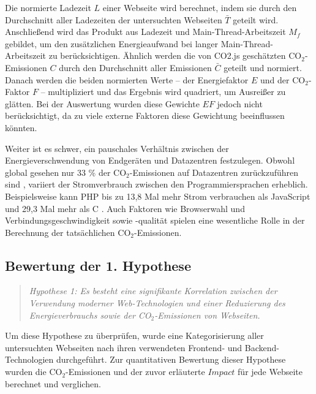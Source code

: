 \documentclass[Bachelor,BIF,german,IEEE]{BASE/twbook}
\begin{document}
\noindent Die normierte Ladezeit $L$ einer Webseite wird berechnet, indem sie durch den Durchschnitt aller Ladezeiten der untersuchten Webseiten $\bar{T}$ geteilt wird. Anschließend wird das Produkt aus Ladezeit und Main-Thread-Arbeitszeit $M_f$ gebildet, um den zusätzlichen Energieaufwand bei langer Main-Thread-Arbeitszeit zu berücksichtigen. Ähnlich werden die von CO2.js geschätzten CO$_2$-Emissionen $C$ durch den Durchschnitt aller Emissionen $\bar{C}$ geteilt und normiert. Danach werden die beiden normierten Werte – der Energiefaktor $E$ und der CO$_2$-Faktor $F$ – multipliziert und das Ergebnis wird quadriert, um Ausreißer zu glätten. Bei der Auswertung wurden diese Gewichte $EF$ jedoch nicht berücksichtigt, da zu viele externe Faktoren diese Gewichtung beeinflussen könnten. \newline

\noindent Weiter ist es schwer, ein pauschales Verhältnis zwischen der Energieverschwendung von Endgeräten und Datazentren festzulegen. Obwohl global gesehen nur 33 \% der CO$_2$-Emissionen auf Datazentren zurückzuführen sind  \cite{PoCo17}, variiert der Stromverbrauch zwischen den Programmiersprachen erheblich. Beispielsweise kann PHP bis zu 13,8 Mal mehr Strom verbrauchen als JavaScript und 29,3 Mal mehr als C  \cite{PrL17}  \cite{PrL20}. Auch Faktoren wie Browserwahl  \cite{EWCF20} und Verbindungsgeschwindigkeit sowie -qualität  \cite{5G21} spielen eine wesentliche Rolle in der Berechnung der tatsächlichen CO$_2$-Emissionen.

\clearpage 

\subsection{Bewertung der 1. Hypothese}

\begin{center}
\begin{quote}
\textit{Hypothese 1: Es besteht eine signifikante Korrelation zwischen der Verwendung moderner Web-Technologien und einer Reduzierung des Energieverbrauchs sowie der CO$_2$-Emissionen von Webseiten.}
\end{quote}
\end{center}

\noindent Um diese Hypothese zu überprüfen, wurde eine Kategorisierung aller untersuchten Webseiten nach ihren verwendeten Frontend- und Backend-Technologien durchgeführt. Zur quantitativen Bewertung dieser Hypothese wurden die CO$_2$-Emissionen und der zuvor erläuterte $Impact$ für jede Webseite berechnet und verglichen.
\end{document}
